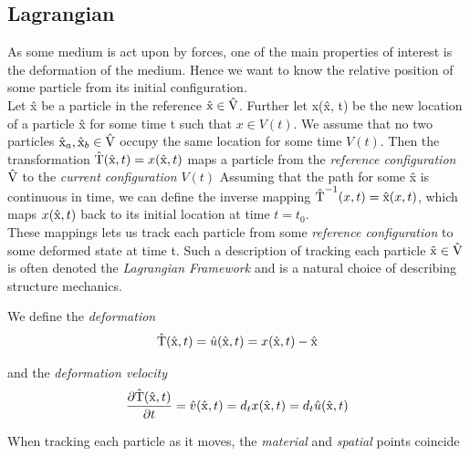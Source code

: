 \subsection{Lagrangian}
As some medium is act upon by forces, one of the main properties of interest is the deformation of the medium. Hence we want to know the relative position of some particle from its initial configuration. \\
Let \^{x} be a particle in the reference  $\text{\^{x}} \in \text{\^{V}}$. 
Further let x(\^x, t) be the new location of a particle \^x for some time t such that $x \in V(t)$. We assume that no two particles $\text{\^{x}}_a, \text{\^{x}}_b \in \text{\^{V}}$ occupy the same location for some time $V(t)$.
Then the transformation $\text{\^{T}}(\text{\^{x}}, t) = x(\text{\^{x}}, t)$ maps a particle  from the \textit{reference configuration} $\text{\^{V}}$ to the  \textit{current configuration} $V(t)$
Assuming that the path for some \^{x} is continuous in time, we can define the inverse mapping $\text{\^{T}}^{-1}(x, t) = \text{\^{x}}(x, t)$, which maps $x(\text{\^{x}}, t)$ back to its initial location at time $t = t_0$. \\
These mappings lets us track each particle from some \textit{reference configuration} to some deformed state at time t. 
Such a description of tracking each particle $\text{\^{x}} \in \text{\^{V}}$ is often denoted the \textit{Lagrangian Framework} and is a natural choice of describing structure mechanics. 

We define the \textit{deformation} 
\begin{align}
\text{\^{T}}(\text{\^{x}}, t) = \hat{u}(\text{\^{x}},t) = x(\text{\^{x}},t) - \text{\^{x}} 
\end{align}

and the \textit{deformation velocity}
\begin{align}
\frac{\partial \text{\^{T}}(\text{\^{x}}, t)}{\partial t} = \hat{v}(\text{\^{x}},t) = d_t x(\text{\^{x}},t) = d_t \hat{u}(\text{\^{x}},t) 
\end{align}

When tracking each particle as it moves, the \textit{material} and \textit{spatial} points coincide

